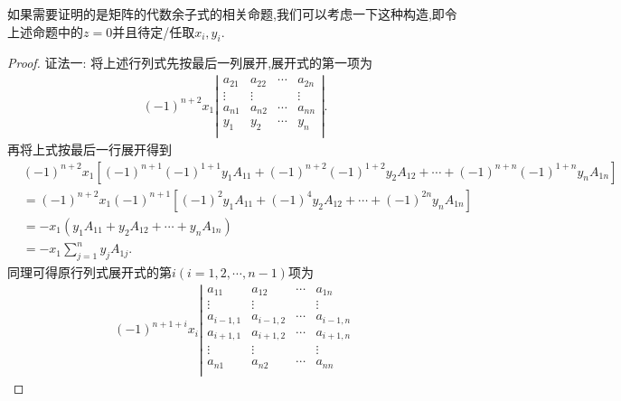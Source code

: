 \documentclass[../../main.tex]{subfiles}
\begin{document}
\begin{remark}
如果需要证明的是矩阵的代数余子式的相关命题,我们可以考虑一下这种构造,即令上述命题中的$z=0$并且待定/任取$x_i,y_i$.
\end{remark}
\begin{proof}
{\color{blue}证法一:}
将上述行列式先按最后一列展开,展开式的第一项为
\begin{equation}
\begin{split}
\left( -1 \right) ^{n+2}x_1\left| \begin{matrix}
a_{21}&		a_{22}&		\cdots&		a_{2n}\\
\vdots&		\vdots&		&		\vdots\\
a_{n1}&		a_{n2}&		\cdots&		a_{nn}\\
y_1&		y_2&		\cdots&		y_n\\
\end{matrix} \right|.
\end{split}
\nonumber
\end{equation}
再将上式按最后一行展开得到
\begin{equation}
\begin{split}
&\left( -1 \right) ^{n+2}x_1\left[ \left( -1 \right) ^{n+1}\left( -1 \right) ^{1+1}y_1A_{11}+\left( -1 \right) ^{n+2}\left( -1 \right) ^{1+2}y_2A_{12}+\cdots +\left( -1 \right) ^{n+n}\left( -1 \right) ^{1+n}y_nA_{1n} \right]
\\
&=\left( -1 \right) ^{n+2}x_1\left( -1 \right) ^{n+1}\left[ \left( -1 \right) ^2y_1A_{11}+\left( -1 \right) ^4y_2A_{12}+\cdots +\left( -1 \right) ^{2n}y_nA_{1n} \right] 
\\
&=-x_1\left( y_1A_{11}+y_2A_{12}+\cdots +y_nA_{1n} \right)
\\
&=-x_1\sum_{j=1}^n{y_jA_{1j}}.            
\end{split}
\nonumber
\end{equation}
同理可得原行列式展开式的第$i(i=1,2,\cdots,n-1)$项为
\begin{equation}
\begin{split}
\left( -1 \right) ^{n+1+i}x_i\left| \begin{matrix}
a_{11}&		a_{12}&		\cdots&		a_{1n}\\
\vdots&		\vdots&		&		\vdots\\
a_{i-1,1}&		a_{i-1,2}&		\cdots&		a_{i-1,n}\\
a_{i+1,1}&		a_{i+1,2}&		\cdots&		a_{i+1,n}\\
\vdots&		\vdots&		&		\vdots\\
a_{n1}&		a_{n2}&		\cdots&		a_{nn}\\

\end{matrix}
\end{split}
\end{equation}
\end{proof}
\end{document}
